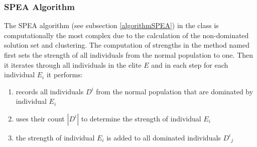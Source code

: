 \subsubsection{SPEA Algorithm}
The SPEA algorithm (see subsection \ref{algorithmSPEA}) in the class 
is computationally the most complex due to the calculation of the non-dominated solution set and clustering.
The computation of strengths in the method named 
first sets the strength of all individuals from the normal population to one.
Then it iterates through all individuals in the elite $E$ and in each step for each
individual $E_i$ it performs:
\begin{enumerate}
  \item records all individuals $D^i$ from the normal population that are dominated by individual $E_i$
  \item uses their count $|D^i|$ to determine the strength of individual $E_i$
  \item the strength of individual $E_i$ is added to all dominated individuals ${D^i}_j$
\end{enumerate}


